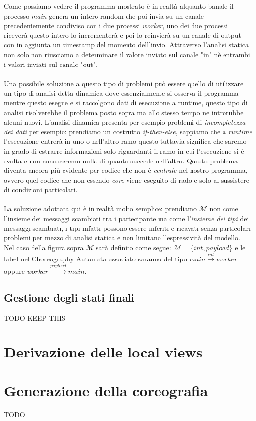 
Come possiamo vedere il programma mostrato è in realtà alquanto banale il processo \emph{main} genera un intero random che poi invia su un canale precedentemente condiviso con i due processi \emph{worker}, uno dei due processi riceverà questo intero lo incrementerà e poi lo reinvierà su un canale di output con in aggiunta un timestamp del momento dell'invio. Attraverso l'analisi statica non solo non riusciamo a determinare il valore inviato sul canale "in" nè entrambi i valori inviati sul canale "out". \\\\
Una possibile soluzione a questo tipo di problemi può essere quello di utilizzare un tipo di analisi detta dinamica dove essenzialmente si osserva il programma mentre questo esegue e si raccolgono dati di esecuzione a runtime, questo tipo di analisi risolverebbe il problema posto sopra ma allo stesso tempo ne introrubbe alcuni nuovi. L'analisi dinamica presenta per esempio problemi di \emph{incompletezza dei dati} per esempio: prendiamo un costrutto \emph{if-then-else}, sappiamo che a \emph{runtime} l'esecuzione entrerà in uno o nell'altro ramo questo tuttavia significa che saremo in grado di estrarre informazioni solo riguardanti il ramo in cui l'esecuzione si è svolta e non conosceremo nulla di quanto succede nell'altro. Questo problema diventa ancora più evidente per codice che non è \emph{centrale} nel nostro programma, ovvero quel codice che non essendo \emph{core} viene eseguito di rado e solo al sussistere di condizioni particolari.\\\\
La soluzione adottata qui è in realtà molto semplice: prendiamo $\mathcal{M}$ non come l'insieme dei messaggi scambiati tra i partecipante ma come l'\emph{insieme dei tipi} dei messaggi scambiati, i tipi infatti possono essere inferiti e ricavati senza particolari problemi per mezzo di analisi statica e non limitano l'espressività del modello. Nel caso della figura sopra $\mathcal{M}$ sarà definito come segue: $\mathcal{M} = \{ int, payload \}$ e le label nel Choreography Automata associato saranno del tipo $main \xrightarrow{int} worker$ oppure $worker \xrightarrow{payload} main$.

\subsection{Gestione degli stati finali}
TODO KEEP THIS

\section{Derivazione delle local views}

\section{Generazione della coreografia}
TODO %
